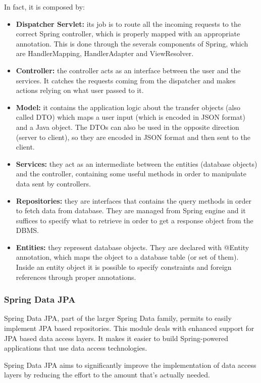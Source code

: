 \documentclass[table, 12pt]{article}
\begin{document}
In fact, it is composed by:
\begin{itemize}
    \item \textbf{Dispatcher Servlet:} its job is to route all the incoming requests to the correct Spring controller, which is properly mapped with an appropriate annotation. This is done through the severals components of Spring, which are HandlerMapping, HandlerAdapter and ViewResolver.
    \item \textbf{Controller:} the controller acts as an interface between the user and the services. It catches the requests coming from the dispatcher and makes actions relying on what user passed to it.
    \item \textbf{Model:} it contains the application logic about the transfer objects (also called DTO) which maps a user input (which is encoded in JSON format) and a Java object. The DTOs can also be used in the opposite direction (server to client), so they are encoded in JSON format and then sent to the client.
    \item \textbf{Services:} they act as an intermediate between the entities (database objects) and the controller, containing some useful methods in order to manipulate data sent by controllers.
    \item \textbf{Repositories:} they are interfaces that contains the query methods in order to fetch data from database. They are managed from Spring engine and it suffices to specify what to retrieve in order to get a response object from the DBMS.
    \item \textbf{Entities:} they represent database objects. They are declared with @Entity annotation, which maps the object to a database table (or set of them). Inside an entity object it is possible to specify constraints and foreign references through proper annotations.
\end{itemize}

\subsubsection{Spring Data JPA}
Spring Data JPA, part of the larger Spring Data family, permits to easily implement JPA based repositories. This module deals with enhanced support for JPA based data access layers. It makes it easier to build Spring-powered applications that use data access technologies.

Spring Data JPA aims to significantly improve the implementation of data access layers by reducing the effort to the amount that’s actually needed.
\end{document}
